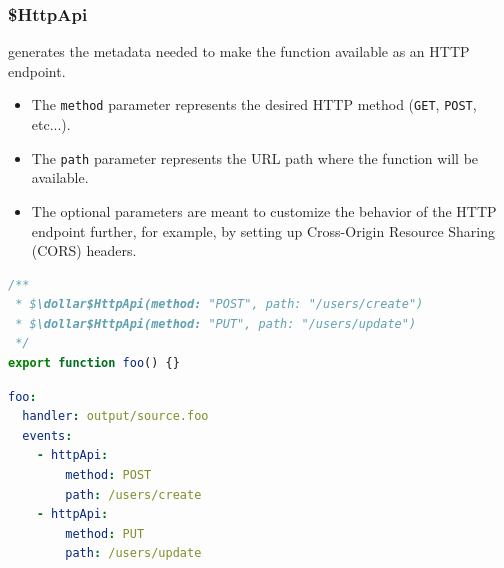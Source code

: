 \subsubsection{\$HttpApi}
generates the metadata needed to make the function available as an HTTP endpoint.
\begin{itemize}
  \item The \verb|method| parameter represents the desired HTTP method (\verb|GET|, \verb|POST|, etc...).
  \item The \verb|path| parameter represents the URL path where the function will be available.
  \item The optional parameters are meant to customize the behavior of the HTTP endpoint further,
     for example, by setting up Cross-Origin Resource Sharing (CORS) headers.
\end{itemize}
\begin{multicols}{2}[\columnsep=1cm]
\begin{lstlisting}[language=javascript]
/**
 * $\dollar$HttpApi(method: "POST", path: "/users/create")
 * $\dollar$HttpApi(method: "PUT", path: "/users/update")
 */
export function foo() {}
\end{lstlisting}

\columnbreak

\begin{lstlisting}[language=yaml]
foo:
  handler: output/source.foo
  events:
    - httpApi:
        method: POST
        path: /users/create
    - httpApi:
        method: PUT
        path: /users/update
\end{lstlisting}
\end{multicols}

